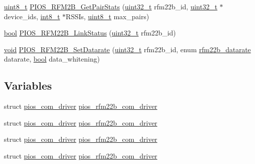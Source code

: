 \begin{DoxyCompactItemize}
\item 
\hyperlink{stdint_8h_aba7bc1797add20fe3efdf37ced1182c5}{uint8\-\_\-t} \hyperlink{group___p_i_o_s___r_f_m22_b_ga2c3963442036bf6e581c9c4e2e6447b9}{P\-I\-O\-S\-\_\-\-R\-F\-M2\-B\-\_\-\-Get\-Pair\-Stats} (\hyperlink{stdint_8h_a435d1572bf3f880d55459d9805097f62}{uint32\-\_\-t} rfm22b\-\_\-id, \hyperlink{stdint_8h_a435d1572bf3f880d55459d9805097f62}{uint32\-\_\-t} $\ast$device\-\_\-ids, \hyperlink{stdint_8h_ad566f6541e98b74246db1a3a3a85ad49}{int8\-\_\-t} $\ast$R\-S\-S\-Is, \hyperlink{stdint_8h_aba7bc1797add20fe3efdf37ced1182c5}{uint8\-\_\-t} max\-\_\-pairs)
\item 
\hyperlink{group___exported__types_gaf6a258d8f3ee5206d682d799316314b1}{bool} \hyperlink{group___p_i_o_s___r_f_m22_b_ga5d2ba4c573bc63f53ccb80f3bdbbc8e4}{P\-I\-O\-S\-\_\-\-R\-F\-M22\-B\-\_\-\-Link\-Status} (\hyperlink{stdint_8h_a435d1572bf3f880d55459d9805097f62}{uint32\-\_\-t} rfm22b\-\_\-id)
\item 
\hyperlink{group___n_a_m_e_ga18028b8badbf1ea7e704ccac3c488e82}{void} \hyperlink{group___p_i_o_s___r_f_m22_b_ga9f3c01f66fd57433e99bc863554a9a19}{P\-I\-O\-S\-\_\-\-R\-F\-M22\-B\-\_\-\-Set\-Datarate} (\hyperlink{stdint_8h_a435d1572bf3f880d55459d9805097f62}{uint32\-\_\-t} rfm22b\-\_\-id, enum \hyperlink{group___p_i_o_s___r_f_m22_b_gaa3e170044f27a00c422ee75f98130ef1}{rfm22b\-\_\-datarate} datarate, \hyperlink{group___exported__types_gaf6a258d8f3ee5206d682d799316314b1}{bool} data\-\_\-whitening)
\end{DoxyCompactItemize}
\subsection*{Variables}
\begin{DoxyCompactItemize}
\item 
struct \hyperlink{structpios__com__driver}{pios\-\_\-com\-\_\-driver} \hyperlink{group___p_i_o_s___r_f_m22_b_gafc506e8bc70ed8b31b75cbddf28ee660}{pios\-\_\-rfm22b\-\_\-com\-\_\-driver}
\item 
struct \hyperlink{structpios__com__driver}{pios\-\_\-com\-\_\-driver} \hyperlink{group___p_i_o_s___r_f_m22_b_gafc506e8bc70ed8b31b75cbddf28ee660}{pios\-\_\-rfm22b\-\_\-com\-\_\-driver}
\item 
struct \hyperlink{structpios__com__driver}{pios\-\_\-com\-\_\-driver} \hyperlink{group___p_i_o_s___r_f_m22_b_gafc506e8bc70ed8b31b75cbddf28ee660}{pios\-\_\-rfm22b\-\_\-com\-\_\-driver}
\item 
struct \hyperlink{structpios__com__driver}{pios\-\_\-com\-\_\-driver} \hyperlink{group___p_i_o_s___r_f_m22_b_gafc506e8bc70ed8b31b75cbddf28ee660}{pios\-\_\-rfm22b\-\_\-com\-\_\-driver}
\end{DoxyCompactItemize}


